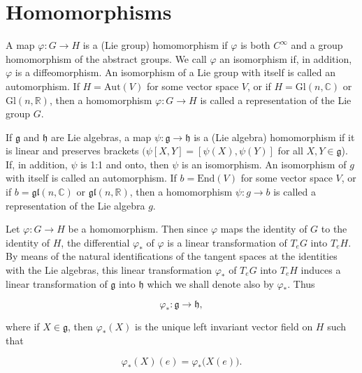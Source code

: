 \section{Homomorphisms}

\begin{definition}\label{thm:3.13}
A map $\varphi: G \to H$ is a (Lie group) homomorphism if $\varphi$ is both $C^\infty$ and a group homomorphism of the abstract groups. We call $\varphi$ an isomorphism if, in addition, $\varphi$ is a diffeomorphism. An isomorphism of a Lie group with itself is called an automorphism. If $H = \text{Aut}(V)$ for some vector space $V$, or if $H = \text{Gl}(n, \mathbb{C})$ or $\text{Gl}(n, \mathbb{R})$, then a homomorphism $\varphi: G \to H$ is called a representation of the Lie group $G$.

If $\mathfrak{g}$ and $\mathfrak{h}$ are Lie algebras, a map $\psi\colon\mathfrak{g}\to\mathfrak{h}$ is a (Lie algebra) homomorphism if it is linear and preserves brackets $(\psi[X,Y]=[\psi(X),\psi(Y)]$ for all $X,Y\in\mathfrak{g}$). If, in addition, $\psi$ is 1:1 and onto, then $\psi$ is an isomorphism. An isomorphism of $g$ with itself is called an automorphism. If $b=\mathrm{End}(V)$ for some vector space $V$, or if $b=\mathfrak{gl}(n,\mathbb{C})$ or $\mathfrak{gl}(n,\mathbb{R})$, then a homomorphism $\psi: g \to b$ is called a representation of the Lie algebra $g$. 

Let $\varphi: G \to H$ be a homomorphism. Then since $\varphi$ maps the identity of $G$ to the identity of $H$, the differential $\varphi_{*}$ of $\varphi$ is a linear transformation of $T_{e} G$ into $T_{e} H$. By means of the natural identifications of the tangent spaces at the identities with the Lie algebras, this linear transformation $\varphi_{*}$ of $T_{e} G$ into $T_{e} H$ induces a linear transformation of $\mathfrak{g}$ into $\mathfrak{h}$ which we shall denote also by $\varphi_{*}$. Thus

\begin{equation}
\tag{1}\label{eq:3.13:1}
\varphi_{*}\colon\mathfrak{g}\to\mathfrak{h},
\end{equation}

where if $X\in\mathfrak{g}$, then $\varphi_{*}(X)$ is the unique left invariant vector field on $H$ such that

\begin{equation}
\tag{2}\label{eq:3.13:2}
\varphi_{*}(X)(e)=\varphi_{*}\bigl(X(e)\bigr).
\end{equation}

\end{definition}

